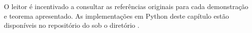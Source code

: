 \begin{observacao}
    O leitor é incentivado a consultar as referências originais para cada
    demonstração e teorema apresentado. As implementações em Python deste
    capítulo estão disponíveis no repositório do \opencodeeco{} sob o
    diretório .
\end{observacao}

